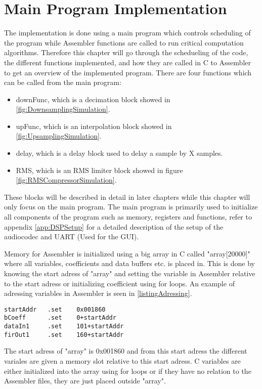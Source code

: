 \chapter{Main Program Implementation} \label{ch:mainprogram}
The implementation is done using a main program which controls scheduling of the program while Assembler functions are called to run critical computation algorithms. Therefore this chapter will go through the schedueling of the code, the different functions implemented, and how they are called in C to Assembler to get an overview of the implemented program. There are four functions which can be called from the main program:
\begin{itemize}
\item downFunc, which is a decimation block showed in \autoref{fig:DownsamplingSimulation}.
\item upFunc, which is an interpolation block showed in \autoref{fig:UpsamplingSimulation}.
\item delay, which is a delay block used to delay a sample by X samples.
\item RMS, which is an RMS limiter block showed in figure \autoref{fig:RMSCompressorSimulation}. 
\end{itemize}
These blocks will be described in detail in later chapters while this chapter will only focus on the main program. The main program is primarily used to initialize all components of the program such as memory, registers and functions, refer to appendix \autoref{app:DSPSetup} for a detailed description of the setup of the audiocodec and UART (Used for the GUI). 

Memory for Assembler is initialized using a big array in C called "array[20000]" where all variables, coefficients and data buffers etc. is placed in. This is done by knowing the start adress of "array" and setting the variable in Assembler relative to the start adress or initializing coefficient using for loops. An example of adressing variables in Assembler is seen in \autoref{listingAdressing}.

\begin{lstlisting}[language={[x86masm]Assembler}, caption = {Adressing Assembler},label={listingAdressing}]
startAddr	.set	0x001860
bCoeff		.set	0+startAddr
dataIn1		.set	101+startAddr
firOut1		.set	160+startAddr
\end{lstlisting}

The start adress of "array" is 0x001860 and from this start adress the different variales are given a memory slot relative to this start adress. C variables are either initialized into the array using for loops or if they have no relation to the Assembler files, they are just placed outside "array".

